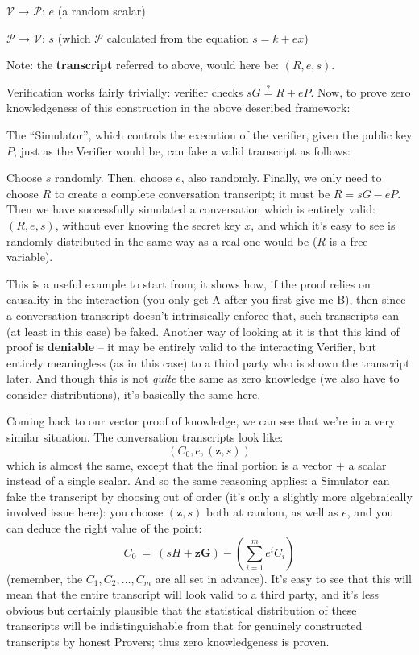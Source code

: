 \documentclass[10pt,a4paper]{article}
\begin{document}
$\mathcal{V}$ → $\mathcal{P}$: $e$ (a random scalar)

$\mathcal{P}$ → $\mathcal{V}$: $s$ (which $\mathcal{P}$ calculated from the equation $s=k+ex$)

Note: the \textbf{transcript} referred to above, would here be: $(R, e, s)$.

Verification works fairly trivially: verifier checks $sG \stackrel{?}{=} R + eP$. Now, to prove
zero knowledgeness of this construction in the above described
framework:

The ``Simulator'', which controls the execution of the verifier, given
the public key $P$, just as the Verifier would be, can fake a valid
transcript as follows:

Choose $s$ randomly. Then, choose $e$, also randomly. Finally, we only need to
choose $R$ to create a complete conversation transcript; it must be $R = sG -eP$. Then
we have successfully simulated a conversation which is entirely valid: $(R, e, s)$,
without ever knowing the secret key $x$, and which it's easy to see is
randomly distributed in the same way as a real one would be ($R$ is a free
variable).

This is a useful example to start from; it shows how, if the proof
relies on causality in the interaction (you only get A after you first
give me B), then since a conversation transcript doesn't intrinsically
enforce that, such transcripts can (at least in this case) be faked.
Another way of looking at it is that this kind of proof is
\textbf{deniable} -- it may be entirely valid to the interacting
Verifier, but entirely meaningless (as in this case) to a third party
who is shown the transcript later. And though this is not \emph{quite}
the same as zero knowledge (we also have to consider distributions),
it's basically the same here.

Coming back to our vector proof of knowledge, we can see that we're in a
very similar situation. The conversation transcripts look like:
\[(C_0, e, (\mathbf{z}, s))\]
which is almost the same, except that the final portion is a vector + a
scalar instead of a single scalar. And so the same reasoning applies: a
Simulator can fake the transcript by choosing out of order (it's only a
slightly more algebraically involved issue here): you choose $(\textbf{z},
s)$ both at random, as well as $e$, and you can deduce the right value of
the point:
\[C_0 \ = \ \left(sH + \mathbf{z}\mathbf{G}\right)-\left(\sum\limits_{i=1}^{m}e^{i}C_{i}\right)\]
(remember, the $C_1, C_2, \ldots ,C_m$ are all set in advance). It's easy to see that this will
mean that the entire transcript will look valid to a third party, and
it's less obvious but certainly plausible that the statistical
distribution of these transcripts will be indistinguishable from that
for genuinely constructed transcripts by honest Provers; thus zero
knowledgeness is proven.
\end{document}
